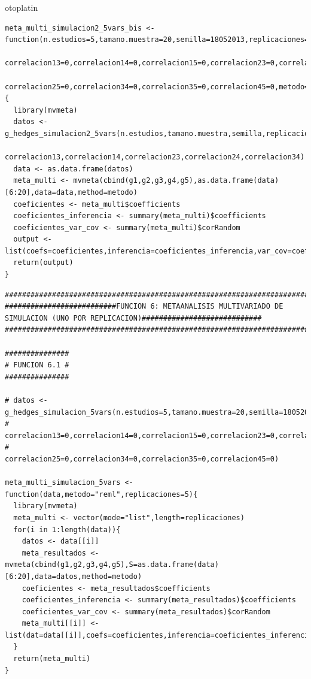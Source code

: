 otoplatin\documentclass[a4paper,openright,12pt]{report}
\begin{document}
{\begin{verbatim}
meta_multi_simulacion2_5vars_bis <- function(n.estudios=5,tamano.muestra=20,semilla=18052013,replicaciones=5,correlacion12=0,
                                             correlacion13=0,correlacion14=0,correlacion15=0,correlacion23=0,correlacion24=0,
                                             correlacion25=0,correlacion34=0,correlacion35=0,correlacion45=0,metodo="reml"){
  library(mvmeta)
  datos <- g_hedges_simulacion2_5vars(n.estudios,tamano.muestra,semilla,replicaciones,correlacion12,
                                      correlacion13,correlacion14,correlacion23,correlacion24,correlacion34)
  data <- as.data.frame(datos)
  meta_multi <- mvmeta(cbind(g1,g2,g3,g4,g5),as.data.frame(data)[6:20],data=data,method=metodo)
  coeficientes <- meta_multi$coefficients
  coeficientes_inferencia <- summary(meta_multi)$coefficients
  coeficientes_var_cov <- summary(meta_multi)$corRandom
  output <- list(coefs=coeficientes,inferencia=coeficientes_inferencia,var_cov=coeficientes_var_cov)
  return(output)  
}
\end{verbatim}
\newpage
\begin{verbatim}
##############################################################################################################################
##########################FUNCION 6: METAANALISIS MULTIVARIADO DE SIMULACION (UNO POR REPLICACION)############################
##############################################################################################################################

###############
# FUNCION 6.1 #
###############

# datos <- g_hedges_simulacion_5vars(n.estudios=5,tamano.muestra=20,semilla=18052013,replicaciones=5,correlacion12=0,
#                                    correlacion13=0,correlacion14=0,correlacion15=0,correlacion23=0,correlacion24=0,
#                                    correlacion25=0,correlacion34=0,correlacion35=0,correlacion45=0)

meta_multi_simulacion_5vars <- function(data,metodo="reml",replicaciones=5){
  library(mvmeta)
  meta_multi <- vector(mode="list",length=replicaciones)
  for(i in 1:length(data)){
    datos <- data[[i]]
    meta_resultados <- mvmeta(cbind(g1,g2,g3,g4,g5),S=as.data.frame(data)[6:20],data=datos,method=metodo)
    coeficientes <- meta_resultados$coefficients
    coeficientes_inferencia <- summary(meta_resultados)$coefficients
    coeficientes_var_cov <- summary(meta_resultados)$corRandom
    meta_multi[[i]] <- list(dat=data[[i]],coefs=coeficientes,inferencia=coeficientes_inferencia,var_cov=coeficientes_var_cov)
  }
  return(meta_multi)  
}


\end{verbatim}}
\end{document}
